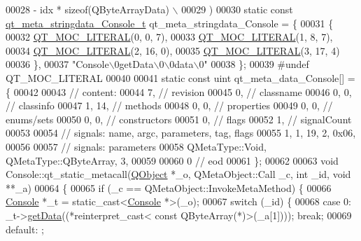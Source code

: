 \begin{DoxyCode}
00028 \textcolor{preprocessor}{        - idx * sizeof(QByteArrayData) \(\backslash\)}
00029 \textcolor{preprocessor}{    )}
00030 \textcolor{keyword}{static} \textcolor{keyword}{const} \hyperlink{a00064_d6/daa/a00187}{qt\_meta\_stringdata\_Console\_t} qt\_meta\_stringdata\_Console = \{
00031     \{
00032 \hyperlink{a00064_a75bb9482d242cde0a06c9dbdc6b83abe}{QT\_MOC\_LITERAL}(0, 0, 7),
00033 \hyperlink{a00064_a75bb9482d242cde0a06c9dbdc6b83abe}{QT\_MOC\_LITERAL}(1, 8, 7),
00034 \hyperlink{a00064_a75bb9482d242cde0a06c9dbdc6b83abe}{QT\_MOC\_LITERAL}(2, 16, 0),
00035 \hyperlink{a00064_a75bb9482d242cde0a06c9dbdc6b83abe}{QT\_MOC\_LITERAL}(3, 17, 4)
00036     \},
00037     \textcolor{stringliteral}{"Console\(\backslash\)0getData\(\backslash\)0\(\backslash\)0data\(\backslash\)0"}
00038 \};
00039 \textcolor{preprocessor}{#undef QT\_MOC\_LITERAL}
00040 
00041 \textcolor{keyword}{static} \textcolor{keyword}{const} uint qt\_meta\_data\_Console[] = \{
00042 
00043  \textcolor{comment}{// content:}
00044        7,       \textcolor{comment}{// revision}
00045        0,       \textcolor{comment}{// classname}
00046        0,    0, \textcolor{comment}{// classinfo}
00047        1,   14, \textcolor{comment}{// methods}
00048        0,    0, \textcolor{comment}{// properties}
00049        0,    0, \textcolor{comment}{// enums/sets}
00050        0,    0, \textcolor{comment}{// constructors}
00051        0,       \textcolor{comment}{// flags}
00052        1,       \textcolor{comment}{// signalCount}
00053 
00054  \textcolor{comment}{// signals: name, argc, parameters, tag, flags}
00055        1,    1,   19,    2, 0x06,
00056 
00057  \textcolor{comment}{// signals: parameters}
00058     QMetaType::Void, QMetaType::QByteArray,    3,
00059 
00060        0        \textcolor{comment}{// eod}
00061 \};
00062 
00063 \textcolor{keywordtype}{void} Console::qt\_static\_metacall(\hyperlink{a00059}{QObject} *\_o, QMetaObject::Call \_c, \textcolor{keywordtype}{int} \_id, \textcolor{keywordtype}{void} **\_a)
00064 \{
00065     \textcolor{keywordflow}{if} (\_c == QMetaObject::InvokeMetaMethod) \{
00066         \hyperlink{a00005}{Console} *\_t = \textcolor{keyword}{static\_cast<}\hyperlink{a00005}{Console} *\textcolor{keyword}{>}(\_o);
00067         \textcolor{keywordflow}{switch} (\_id) \{
00068         \textcolor{keywordflow}{case} 0: \_t->\hyperlink{a00005_a1976aad46ce1a77be730bc628275038f}{getData}((*\textcolor{keyword}{reinterpret\_cast<} \textcolor{keyword}{const }QByteArray(*)\textcolor{keyword}{>}(\_a[1]))); \textcolor{keywordflow}{break};
00069         \textcolor{keywordflow}{default}: ;

\end{DoxyCode}
